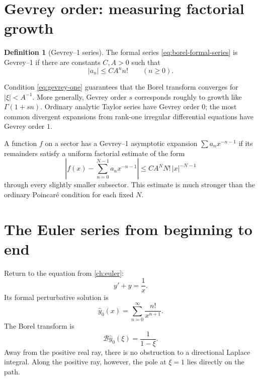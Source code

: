 \documentclass[11pt,openany]{book}
\theoremstyle{definition}
\newtheorem{definition}{Definition}[chapter]
\theoremstyle{plain}
\theoremstyle{remark}
\newcommand{\trans}[1]{\widehat{#1}}
\newcommand{\Borel}{\mathcal{B}}
\begin{document}
\section{Gevrey order: measuring factorial growth}

\begin{definition}[Gevrey--1 series]
The formal series \eqref{eq:borel-formal-series} is Gevrey--1 if there are constants $C,A>0$ such that
\begin{equation}\label{eq:gevrey-one}
 |a_n|\le CA^n n!
 \qquad(n\ge0).
\end{equation}
\end{definition}

Condition \eqref{eq:gevrey-one} guarantees that the Borel transform converges for $|\xi|<A^{-1}$. More generally, Gevrey order $s$ corresponds roughly to growth like $\Gamma(1+sn)$. Ordinary analytic Taylor series have Gevrey order $0$; the most common divergent expansions from rank-one irregular differential equations have Gevrey order $1$.

A function $f$ on a sector has a Gevrey--1 asymptotic expansion $\sum a_nx^{-n-1}$ if its remainders satisfy a uniform factorial estimate of the form
\begin{equation}\label{eq:gevrey-remainder}
 \left|f(x)-\sum_{n=0}^{N-1}a_nx^{-n-1}\right|
 \le C A^N N!\,|x|^{-N-1}
\end{equation}
through every slightly smaller subsector. This estimate is much stronger than the ordinary Poincar\'e condition for each fixed $N$.

\section{The Euler series from beginning to end}

Return to the equation from \cref{ch:euler}:
\begin{equation}\label{eq:euler-borel-ode}
 y'+y=\frac1x.
\end{equation}
Its formal perturbative solution is
\begin{equation}\label{eq:euler-borel-series}
 \trans y_0(x)=\sum_{n=0}^{\infty}\frac{n!}{x^{n+1}}.
\end{equation}
The Borel transform is
\begin{equation}\label{eq:euler-borel-transform}
 \Borel\trans y_0(\xi)=\frac1{1-\xi}.
\end{equation}
Away from the positive real ray, there is no obstruction to a directional Laplace integral. Along the positive ray, however, the pole at $\xi=1$ lies directly on the path.
\end{document}
